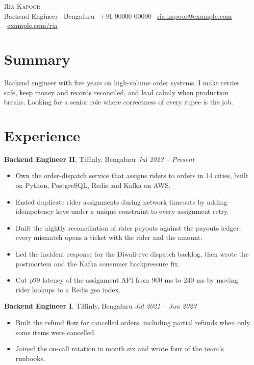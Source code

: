 \documentclass[10.5pt,a4paper]{article}
\newcommand{\role}[3]{\par\vspace{4pt}\textbf{#1}, #2 \hfill {\itshape #3}\par\vspace{1pt}}
\begin{document}
\begin{center}
{\Huge\scshape Ria Kapoor}\\[3pt]
{\color{greytext}Backend Engineer \textperiodcentered\ Bengaluru \textperiodcentered\ +91 90000 00000 \textperiodcentered\ \href{mailto:ria.kapoor@example.com}{ria.kapoor@example.com} \textperiodcentered\ \href{https://example.com/ria}{example.com/ria}}
\end{center}

\section{Summary}
Backend engineer with five years on high-volume order systems. I make retries safe, keep money and records reconciled, and lead calmly when production breaks. Looking for a senior role where correctness of every rupee is the job.

\section{Experience}
\role{Backend Engineer II}{Tiffinly, Bengaluru}{Jul 2023 -- Present}
\begin{itemize}
  \item Own the order-dispatch service that assigns riders to orders in 14 cities, built on Python, PostgreSQL, Redis and Kafka on AWS.
  \item Ended duplicate rider assignments during network timeouts by adding idempotency keys under a unique constraint to every assignment retry.
  \item Built the nightly reconciliation of rider payouts against the payouts ledger; every mismatch opens a ticket with the rider and the amount.
  \item Led the incident response for the Diwali-eve dispatch backlog, then wrote the postmortem and the Kafka consumer backpressure fix.
  \item Cut p99 latency of the assignment API from 900 ms to 240 ms by moving rider lookups to a Redis geo index.
\end{itemize}
\role{Backend Engineer I}{Tiffinly, Bengaluru}{Jul 2021 -- Jun 2023}
\begin{itemize}
  \item Built the refund flow for cancelled orders, including partial refunds when only some items were cancelled.
  \item Joined the on-call rotation in month six and wrote four of the team's runbooks.
\end{itemize}
\end{document}
